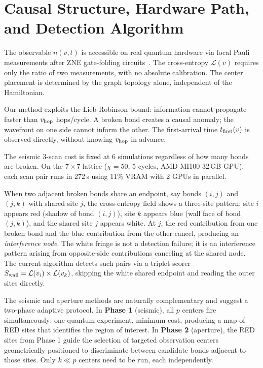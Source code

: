 \documentclass[11pt]{article}
\begin{document}
\section{Causal Structure, Hardware Path, and Detection Algorithm}

The observable $n(v,t)$ is accessible on real quantum hardware via local
Pauli measurements after ZNE gate-folding circuits~\cite{giurgica2020digital}.
The cross-entropy $\mathcal{L}(v)$ requires only the ratio of two measurements,
with no absolute calibration. The center placement is determined by the graph
topology alone, independent of the Hamiltonian.

Our method exploits the Lieb-Robinson bound: information cannot propagate
faster than $v_{\rm hop}$ hops/cycle. A broken bond creates a causal anomaly;
the wavefront on one side cannot inform the other. The first-arrival time
$t_{\rm first}(v)$ is observed directly, without knowing $v_{\rm hop}$ in advance.

The seismic 3-scan cost is fixed at 6 simulations regardless of how many bonds
are broken. On the $7\times7$ lattice ($\chi=50$, 5 cycles, AMD MI100 32\,GB GPU),
each scan pair runs in 272\,s using 11\% VRAM with 2 GPUs in parallel.

When two adjacent broken bonds share an endpoint, say bonds $(i,j)$ and
$(j,k)$ with shared site $j$, the cross-entropy field shows a three-site
pattern: site $i$ appears red (shadow of bond $(i,j)$), site $k$ appears
blue (wall face of bond $(j,k)$), and the shared site $j$ appears white.
At $j$, the red contribution from one broken bond and the blue contribution
from the other cancel, producing an \emph{interference node}. The white
fringe is not a detection failure; it is an interference pattern arising
from opposite-side contributions canceling at the shared node.
The current algorithm detects such pairs via a triplet scorer
$S_{\rm wall} = \mathcal{L}(v_i) \times \mathcal{L}(v_k)$, skipping the
white shared endpoint and reading the outer sites directly.

The seismic and aperture methods are naturally complementary and suggest
a two-phase adaptive protocol. In \textbf{Phase 1} (seismic), all $p$ centers
fire simultaneously: one quantum experiment, minimum cost, producing a map of
RED sites that identifies the region of interest. In \textbf{Phase 2} (aperture),
the RED sites from Phase 1 guide the selection of targeted observation centers
geometrically positioned to discriminate between candidate bonds adjacent to
those sites. Only $k \ll p$ centers need to be run, each independently.
\end{document}
